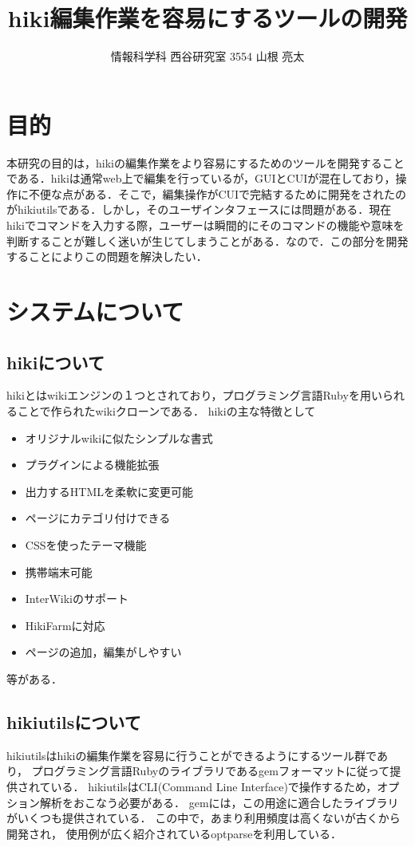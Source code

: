 \documentclass[a4j,twocolumn]{jsarticle}
\begin{document}
\title{hiki編集作業を容易にするツールの開発}
\author{情報科学科 西谷研究室 3554 山根 亮太}
\date{}
\maketitle
\section{目的}
本研究の目的は，hikiの編集作業をより容易にするためのツールを開発することである．hikiは通常web上で編集を行っているが，GUIとCUIが混在しており，操作に不便な点がある．そこで，編集操作がCUIで完結するために開発をされたのがhikiutilsである．しかし，そのユーザインタフェースには問題がある．現在hikiでコマンドを入力する際，ユーザーは瞬間的にそのコマンドの機能や意味を判断することが難しく迷いが生じてしまうことがある．なので．この部分を開発することによりこの問題を解決したい．

\section{システムについて}
\subsection{hikiについて}
hikiとはwikiエンジンの１つとされており，プログラミング言語Rubyを用いられることで作られたwikiクローンである．
hikiの主な特徴として
\begin{itemize}
\item オリジナルwikiに似たシンプルな書式
\item プラグインによる機能拡張
\item 出力するHTMLを柔軟に変更可能
\item ページにカテゴリ付けできる
\item CSSを使ったテーマ機能
\item 携帯端末可能
\item InterWikiのサポート
\item HikiFarmに対応
\item ページの追加，編集がしやすい
\end{itemize}
等がある\cite{hiki}．

\subsection{hikiutilsについて}
hikiutilsはhikiの編集作業を容易に行うことができるようにするツール群であり，
プログラミング言語Rubyのライブラリであるgemフォーマットに従って提供されている\cite{gem}．
hikiutilsはCLI(Command Line Interface)で操作するため，オプション解析をおこなう必要がある．
gemには，この用途に適合したライブラリがいくつも提供されている\cite{opt_ranking}．
この中で，あまり利用頻度は高くないが古くから開発され，
使用例が広く紹介されているoptparseを利用している．
\end{document}
